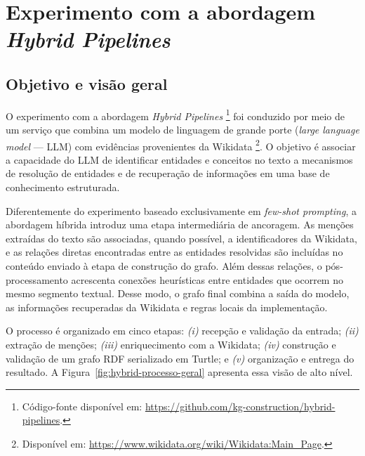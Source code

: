 
\section{Experimento com a abordagem \textit{Hybrid Pipelines}}
\label{sec:experimento-hybrid-pipelines}

\subsection{Objetivo e visão geral}
\label{subsec:hybrid-visao-geral}

O experimento com a abordagem \textit{Hybrid Pipelines}%
\footnote{Código-fonte disponível em:
\url{https://github.com/kg-construction/hybrid-pipelines}.}
foi conduzido por meio de um serviço que combina um modelo de linguagem de
grande porte (\textit{large language model} --- LLM) com evidências provenientes
da Wikidata%
\footnote{Disponível em:
\url{https://www.wikidata.org/wiki/Wikidata:Main_Page}.}.
O objetivo é associar a capacidade do LLM de identificar entidades e conceitos
no texto a mecanismos de resolução de entidades e de recuperação de
informações em uma base de conhecimento estruturada.

Diferentemente do experimento baseado exclusivamente em \textit{few-shot
prompting}, a abordagem híbrida introduz uma etapa intermediária de ancoragem.
As menções extraídas do texto são associadas, quando possível, a identificadores
da Wikidata, e as relações diretas encontradas entre as entidades resolvidas são
incluídas no conteúdo enviado à etapa de construção do grafo. Além dessas
relações, o pós-processamento acrescenta conexões heurísticas entre entidades
que ocorrem no mesmo segmento textual. Desse modo, o grafo final combina a
saída do modelo, as informações recuperadas da Wikidata e regras locais da
implementação.

O processo é organizado em cinco etapas: \textit{(i)} recepção e validação da
entrada; \textit{(ii)} extração de menções; \textit{(iii)} enriquecimento com a
Wikidata; \textit{(iv)} construção e validação de um grafo RDF serializado em
Turtle; e
\textit{(v)} organização e entrega do resultado. A
Figura~\ref{fig:hybrid-processo-geral} apresenta essa visão de alto nível.

